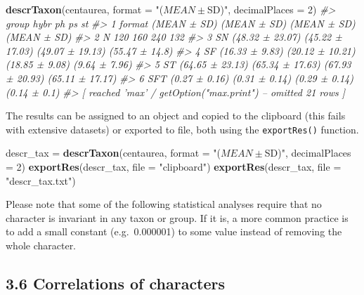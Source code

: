 \documentclass[
]{article}
\newenvironment{Shaded}{\begin{snugshade}}{\end{snugshade}}
\newcommand{\CommentTok}[1]{\textcolor[rgb]{0.56,0.35,0.01}{\textit{#1}}}
\newcommand{\DataTypeTok}[1]{\textcolor[rgb]{0.13,0.29,0.53}{#1}}
\newcommand{\DecValTok}[1]{\textcolor[rgb]{0.00,0.00,0.81}{#1}}
\newcommand{\KeywordTok}[1]{\textcolor[rgb]{0.13,0.29,0.53}{\textbf{#1}}}
\newcommand{\NormalTok}[1]{#1}
\newcommand{\StringTok}[1]{\textcolor[rgb]{0.31,0.60,0.02}{#1}}
\begin{document}
\begin{Shaded}
\begin{Highlighting}[]
\KeywordTok{descrTaxon}\NormalTok{(centaurea, }\DataTypeTok{format =} \StringTok{"($MEAN ± $SD)"}\NormalTok{, }\DataTypeTok{decimalPlaces =} \DecValTok{2}\NormalTok{)}
\CommentTok{#>    group            hybr              ph              ps              st}
\CommentTok{#> 1 format     (MEAN ± SD)     (MEAN ± SD)     (MEAN ± SD)     (MEAN ± SD)}
\CommentTok{#> 2      N             120             160             240             132}
\CommentTok{#> 3     SN (48.32 ± 23.07) (45.22 ± 17.03) (49.07 ± 19.13)  (55.47 ± 14.8)}
\CommentTok{#> 4     SF  (16.33 ± 9.83) (20.12 ± 10.21)  (18.85 ± 9.08)   (9.64 ± 7.96)}
\CommentTok{#> 5     ST (64.65 ± 23.13) (65.34 ± 17.63) (67.93 ± 20.93) (65.11 ± 17.17)}
\CommentTok{#> 6    SFT   (0.27 ± 0.16)   (0.31 ± 0.14)   (0.29 ± 0.14)    (0.14 ± 0.1)}
\CommentTok{#>  [ reached 'max' / getOption("max.print") -- omitted 21 rows ]}
\end{Highlighting}
\end{Shaded}

The results can be assigned to an object and copied to the clipboard
(this fails with extensive datasets) or exported to file, both using the
\texttt{exportRes()} function.

\begin{Shaded}
\begin{Highlighting}[]
\NormalTok{descr_tax =}\StringTok{ }\KeywordTok{descrTaxon}\NormalTok{(centaurea, }\DataTypeTok{format =} \StringTok{"($MEAN ± $SD)"}\NormalTok{, }\DataTypeTok{decimalPlaces =} \DecValTok{2}\NormalTok{)}
\KeywordTok{exportRes}\NormalTok{(descr_tax, }\DataTypeTok{file =} \StringTok{"clipboard"}\NormalTok{)}
\KeywordTok{exportRes}\NormalTok{(descr_tax, }\DataTypeTok{file =} \StringTok{"descr_tax.txt"}\NormalTok{)}
\end{Highlighting}
\end{Shaded}

Please note that some of the following statistical analyses require that
no character is invariant in any taxon or group. If it is, a more common
practice is to add a small constant (e.g.~0.000001) to some value
instead of removing the whole character.

\hypertarget{correlations-of-characters}{%
\subsection{3.6 Correlations of
characters}\label{correlations-of-characters}}
\end{document}
